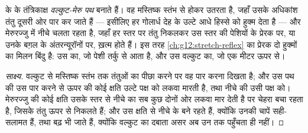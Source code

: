 \begin{proposition}[वल्कुट से प्रेरक न्यूरॉन तक]\label{prop:g12:brain-and-movement:pathway}
 के  के तंत्रिकाक्ष \emph{वल्कुट-मेरु
पथ} बनाते हैं। वह मस्तिष्क स्तंभ से होकर उतरता है,
जहाँ उसके अधिकांश तंतु दूसरी ओर पार कर जाते हैं --- इसीलिए हर गोलार्ध देह के
उल्टे आधे हिस्से को हुक्म देता है --- और मेरुरज्जु में नीचे चलता रहता है,
जहाँ हर स्तर पर तंतु निकलकर उस स्तर की पेशियों के प्रेरक  पर, या
उनके बग़ल के अंतरन्यूरॉनों पर, ख़त्म होते हैं। इस तरह
\cref{ch:g12:stretch-reflex} का प्रेरक  दो हुक्मों का मिलन बिंदु है:
उस  का, जो पेशी तर्कु से आता है, और उस वल्कुट का, जो एक मीटर
ऊपर से।
\end{proposition}
\begin{proof}[साक्ष्य]
वल्कुट से मस्तिष्क स्तंभ तक तंतुओं का पीछा करने पर वह पार करना दिखता है; और
उस पथ की उस पार करने से ऊपर की कोई क्षति उल्टे पक्ष को लकवा मारती है, तथा
नीचे की उसी पक्ष को। मेरुरज्जु की कोई क्षति उसके स्तर से नीचे का सब कुछ
दोनों ओर लकवा मार देती है पर चेहरा बचा रहता है, जिसके तंतु ऊपर से निकलते
हैं; और उस क्षति से नीचे के  बने रहते हैं, क्योंकि उनकी चापें
सही-सलामत हैं, तथा बढ़ भी जाते हैं, क्योंकि वल्कुट का दबाता असर अब उन तक
पहुँचता ही नहीं।
\end{proof}

